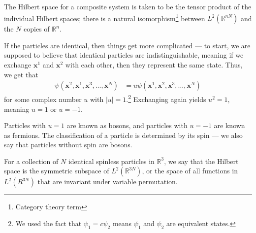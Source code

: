 \documentclass[12pt]{extarticle}
\newcommand{\R}{\mathbb{R}}
\theoremstyle{plain}
\theoremstyle{definition}
\theoremstyle{remark}
\renewcommand{\newline}{\hfill\break}
\begin{document}
  The Hilbert space for a composite system is taken to be the tensor product of the individual Hilbert spaces; there is a natural isomorphism\footnote{Category theory term} between $L^{2}(\R^{nN})$ and the $N$ copies of $\R^n$.\newline

  If the particles are identical, then things get more complicated --- to start, we are supposed to believe that identical particles are indistinguishable, meaning if we exchange $\mathbf{x}^1$ and $\mathbf{x}^2$ with each other, then they represent the same state. Thus, we get that
  \begin{align*}
    \psi\left(\mathbf{x}^2,\mathbf{x}^1,\mathbf{x}^3,\dots,\mathbf{x}^N\right) &= u\psi \left(\mathbf{x}^1,\mathbf{x}^2,\mathbf{x}^3,\dots,\mathbf{x}^N\right)
  \end{align*}
  for some complex number $u$ with $|u| = 1$.\footnote{We used the fact that $\psi_1 = c\psi_2$ means $\psi_1$ and $\psi_2$ are equivalent states.} Exchanging again yields $u^2 = 1$, meaning $u = 1$ or $u = -1$.\newline

  Particles with $u = 1$ are known as bosons, and particles with $u = -1$ are known as fermions. The classification of a particle is determined by its spin --- we also say that particles without spin are bosons.\newline

  For a collection of $N$ identical spinless particles in $\R^{3}$, we say that the Hilbert space is the symmetric subspace of $L^{2}\left(\R^{3N}\right)$, or the space of all functions in $L^{2}\left(R^{3N}\right)$ that are invariant under variable permutation.
\end{document}

